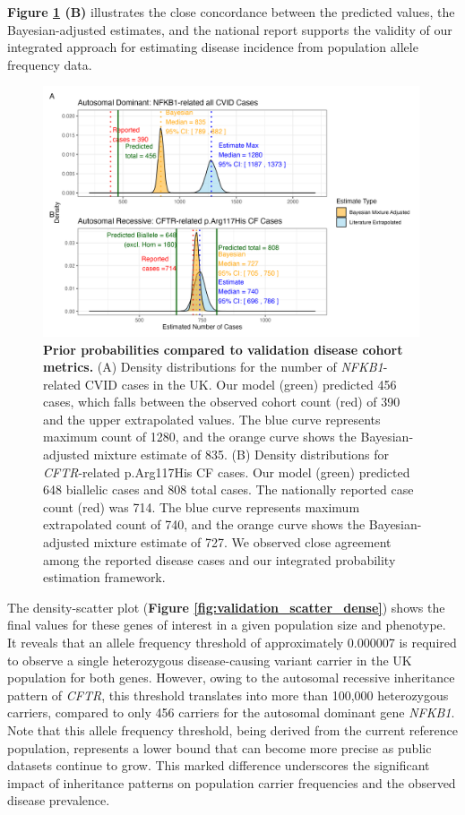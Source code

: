 \textbf{Figure \ref{fig:validation_studies_bayesian_adjusted_estimates} (B)} illustrates the close concordance between the predicted values, the Bayesian-adjusted estimates, and the national report supports the validity of our integrated approach for estimating disease incidence from population allele frequency data.

\begin{figure}[ht]
  \centering
  \includegraphics[width=0.99\textwidth]{../images/validation_studies_bayesian_adjusted_estimates.png}
  \caption{\textbf{Prior probabilities compared to validation disease cohort metrics.}
  (A) Density distributions for the number of \textit{NFKB1}-related CVID cases in the UK. 
  Our model (green) predicted 456 cases, which falls between the observed cohort count (red) of 390 and the upper extrapolated values.
  The blue curve represents maximum count of 1280, and the orange curve shows the Bayesian-adjusted mixture estimate of 835. 
(B) Density distributions for \textit{CFTR}-related p.Arg117His CF cases. 
Our model (green) predicted 648 biallelic cases and 808 total cases.
The nationally reported case count (red) was 714.
The blue curve represents maximum extrapolated count of 740, and the orange curve shows the Bayesian-adjusted mixture estimate of 727. We observed close agreement among the reported disease cases and our integrated probability estimation framework.}
  \label{fig:validation_studies_bayesian_adjusted_estimates}
\end{figure}

The density-scatter plot (\textbf{Figure \ref{fig:validation_scatter_dense}}) shows the final values for these genes of interest in a given population size and phenotype. It reveals that an allele frequency threshold of approximately 0.000007 is required to observe a single heterozygous disease-causing variant carrier in the UK population for both genes. However, owing to the autosomal recessive inheritance pattern of \textit{CFTR}, this threshold translates into more than 100,000 heterozygous carriers, compared to only 456 carriers for the autosomal dominant gene \textit{NFKB1}. Note that this allele frequency threshold, being derived from the current reference population, represents a lower bound that can become more precise as public datasets continue to grow. This marked difference underscores the significant impact of inheritance patterns on population carrier frequencies and the observed disease prevalence.


